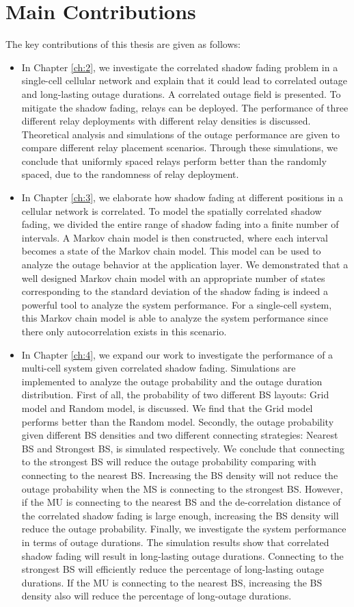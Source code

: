  \section{Main Contributions}
 \par The key contributions of this thesis are given as follows:
 \begin{itemize}
 \item In Chapter \ref{ch:2}, we investigate the correlated shadow fading problem in a single-cell cellular network and explain that it could lead to correlated outage and long-lasting outage durations. A correlated outage field is presented. To mitigate the shadow fading, relays can be deployed. The performance of three different relay deployments with different relay densities is discussed. Theoretical analysis and simulations of the outage performance are given to compare different relay placement scenarios. Through these simulations, we conclude that uniformly spaced relays perform better than the randomly spaced, due to the randomness of relay deployment. 
 \item In Chapter \ref{ch:3}, we elaborate how shadow fading at different positions in a cellular network is correlated. To model the spatially correlated shadow fading, we divided the entire range of shadow fading into a finite number of intervals. A Markov chain model is then constructed, where each interval becomes a state of the Markov chain model. This model can be used to analyze the outage behavior at the application layer. We demonstrated that a well designed Markov chain model with an appropriate number of states corresponding to the standard deviation of the shadow fading is indeed a powerful tool to analyze the system performance. For a single-cell system, this Markov chain model is able to analyze the system performance since there only autocorrelation exists in this scenario. 
 \item In Chapter \ref{ch:4}, we expand our work to investigate the performance of a multi-cell system given correlated shadow fading. Simulations are implemented to analyze the outage probability and the outage duration distribution. First of all, the probability of two different BS layouts: Grid model and Random model, is discussed. We find that the Grid model performs better than the Random model. Secondly, the outage probability given different BS densities and two different connecting strategies: Nearest BS and Strongest BS, is simulated respectively. We conclude that connecting to the strongest BS will reduce the outage probability comparing with connecting to the nearest BS. Increasing the BS density will not reduce the outage probability when the MS is connecting to the strongest BS. However, if the MU is connecting to the nearest BS and the de-correlation distance of the correlated shadow fading is large enough, increasing the BS density will reduce the outage probability. Finally, we investigate the system performance in terms of outage durations. The simulation results show that correlated shadow fading will result in long-lasting outage durations. Connecting to the strongest BS will efficiently reduce the percentage of long-lasting outage durations. If the MU is connecting to the nearest BS, increasing the BS density also will reduce the percentage of long-outage durations.

\end{itemize}
